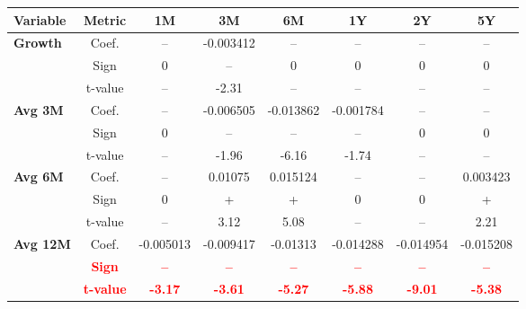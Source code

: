 \documentclass[11pt,english,a4paper,hidelinks]{book}
\begin{document}
\begin{table}[H]
    \centering
    \begin{tabular}{lccccccc}
        \toprule
        \textbf{Variable} & \textbf{Metric} & \textbf{1M} & \textbf{3M} & \textbf{6M} & \textbf{1Y} & \textbf{2Y} & \textbf{5Y} \\
        \midrule
        \multirow{3}{*}{\textbf{Growth}}
            & Coef.   & --        & -0.003412 & --        & --        & --        & --        \\
            & Sign    & 0         & –         & 0         & 0         & 0         & 0         \\
            & t-value & --        & -2.31     & --        & --        & --        & --        \\
        \cmidrule{1-8}
        \multirow{3}{*}{\textbf{Avg 3M}}
            & Coef.   & --        & -0.006505 & -0.013862 & -0.001784 & --        & --        \\
            & Sign    & 0         & –         & –         & –         & 0         & 0         \\
            & t-value & --        & -1.96     & -6.16     & -1.74     & --        & --        \\
        \cmidrule{1-8}
        \multirow{3}{*}{\textbf{Avg 6M}}
            & Coef.   & --        & 0.01075   & 0.015124  & --        & --        & 0.003423  \\
            & Sign    & 0         & +         & +         & 0         & 0         & +         \\
            & t-value & --        & 3.12      & 5.08      & --        & --        & 2.21      \\
        \cmidrule{1-8}
        \multirow{3}{*}{\textbf{Avg 12M}}
            & Coef.   & -0.005013 & -0.009417 & -0.01313  & -0.014288 & -0.014954 & -0.015208 \\
            & \textbf{\textcolor{red}{Sign}}    & \textbf{\textcolor{red}{–}}         & \textbf{\textcolor{red}{–}}         & \textbf{\textcolor{red}{–}}         & \textbf{\textcolor{red}{–}}         & \textbf{\textcolor{red}{–}}         & \textbf{\textcolor{red}{–}}         \\
            & \textbf{\textcolor{red}{t-value}} & \textbf{\textcolor{red}{-3.17}}     & \textbf{\textcolor{red}{-3.61}}     & \textbf{\textcolor{red}{-5.27}}     & \textbf{\textcolor{red}{-5.88}}     & \textbf{\textcolor{red}{-9.01}}     & \textbf{\textcolor{red}{-5.38}}     \\
        \cmidrule{1-8}

\end{tabular}
\end{table}
\end{document}
